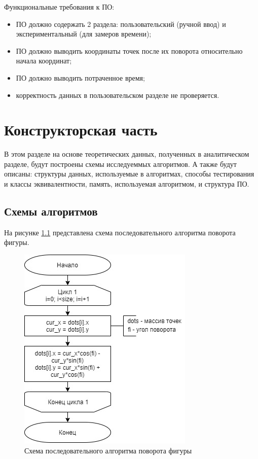 \documentclass[12pt]{report}
\begin{document}
	Функциональные требования к ПО:
	
	\begin{itemize}
		\item ПО должно содержать 2 раздела: пользовательский (ручной ввод) и экспериментальный (для замеров времени);
		\item ПО должно выводить координаты точек после их поворота относительно начала координат;
		\item ПО должно выводить потраченное время;
		\item корректность данных в пользовательском разделе не проверяется.
	\end{itemize}
	
	\clearpage
	
	\chapter{Конструкторская часть}
	
	В этом разделе на основе теоретических данных, полученных в аналитическом разделе, будут построены схемы исследуеммых алгоритмов. А также будут описаны: структуры данных, используемые в алгоритмах, способы тестирования и классы эквивалентности, память, используемая алгоритмом, и структура ПО.
	
	\section{Схемы алгоритмов}
	На рисунке \ref{fig:linear} представлена схема последовательного алгоритма поворота фигуры.
	
	\begin{figure}[h]
		\centering
		\includegraphics[scale=1]{linear.jpg}
		\caption{Схема последовательного алгоритма поворота фигуры}
		\label{fig:linear}
	\end{figure}
\end{document}
